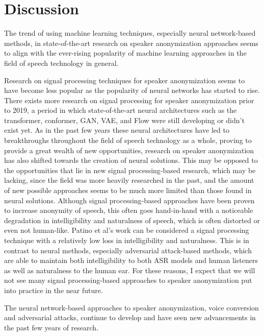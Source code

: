 \documentclass{Interspeech2024}
\begin{document}
\section{Discussion}
The trend of using machine learning techniques, especially neural network-based methods, in state-of-the-art research on speaker anonymization approaches seems to align with the ever-rising popularity of machine learning approaches in the field of speech technology in general.

Research on signal processing techniques for speaker anonymization seems to have become less popular as the popularity of neural networks has started to rise.
There exists more research on signal processing for speaker anonymization prior to 2019, a period in which state-of-the-art neural architectures such as the transformer, conformer, GAN, VAE, and Flow were still developing or didn't exist yet.
As in the past few years these neural architectures have led to breakthroughs throughout the field of speech technology as a whole, proving to provide a great wealth of new opportunities, research on speaker anonymization has also shifted towards the creation of neural solutions.
This may be opposed to the opportunities that lie in new signal processing-based research, which may be lacking, since the field was more heavily researched in the past, and the amount of new possible approaches seems to be much more limited than those found in neural solutions.
Although signal processing-based approaches have been proven to increase anonymity of speech, this often goes hand-in-hand with a noticeable degradation in intelligibility and naturalness of speech, which is often distorted or even not human-like.
Patino et al's \cite{patino_2021_mcadams} work can be considered a signal processing technique with a relatively low loss in intelligibility and naturalness.
This is in contrast to neural methods, especially adversarial attack-based methods, which are able to maintain both intelligibility to both ASR models and human listeners as well as naturalness to the human ear.
For these reasons, I expect that we will not see many signal processing-based approaches to speaker anonymization put into practice in the near future.

The neural network-based approaches to speaker anonymization, voice conversion and adversarial attacks, continue to develop and have seen new advancements in the past few years of research.
\end{document}
